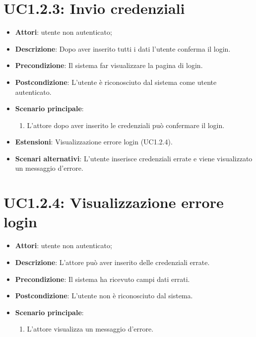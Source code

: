 \section{UC1.2.3: Invio credenziali}
\label{UC1.2.3}
\begin{itemize}
	\item \textbf{Attori}: utente non autenticato;
	\item \textbf{Descrizione}: Dopo aver inserito tutti i dati l'utente conferma il login.
	\item \textbf{Precondizione}: Il sistema far visualizzare la pagina di login.
	\item \textbf{Postcondizione}: L'utente è riconosciuto dal sistema come utente autenticato.
	\item \textbf{Scenario principale}:
	\begin{enumerate} \item L'attore dopo aver inserito le credenziali può confermare il login.\end{enumerate}
	\item \textbf{Estensioni}:
	Visualizzazione errore login (UC1.2.4).
	\item \textbf{Scenari alternativi}:
	L'utente inserisce credenziali errate e viene visualizzato un messaggio d'errore.
\end{itemize}

\section{UC1.2.4: Visualizzazione errore login}
\label{UC1.2.4}
\begin{itemize}
	\item \textbf{Attori}: utente non autenticato;
	\item \textbf{Descrizione}: L'attore può aver inserito delle credenziali errate.
	\item \textbf{Precondizione}: Il sistema ha ricevuto campi dati errati.
	\item \textbf{Postcondizione}: L'utente non è riconosciuto dal sistema.
	\item \textbf{Scenario principale}:
	\begin{enumerate} \item L'attore visualizza un messaggio d'errore.\end{enumerate}
\end{itemize}

